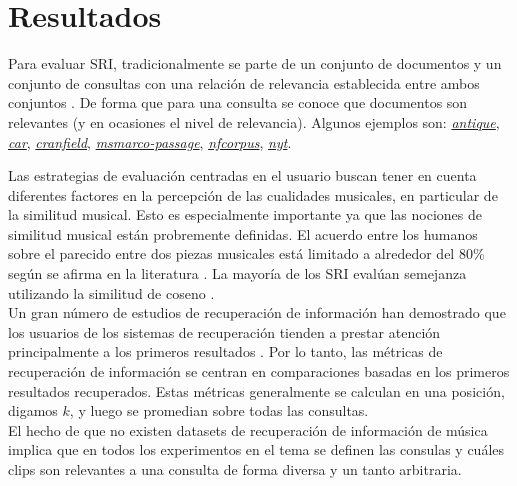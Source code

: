 \section{Resultados}
\label{sec:results}
Para evaluar SRI, tradicionalmente se parte de un conjunto de documentos y un conjunto de consultas con una relación de relevancia establecida entre ambos conjuntos \cite{manning2008introductiontoIR}. De forma que para una consulta se conoce que documentos son relevantes (y en ocasiones el nivel de relevancia). Algunos ejemplos son: \href{https://ir-datasets.com/antique.html}{\textit{antique}}, \href{https://ir-datasets.com/car.html}{\textit{car}}, \href{https://ir-datasets.com/cranfield.html}{\textit{cranfield}}, \href{https://ir-datasets.com/msmarco-passage.html}{\textit{msmarco-passage}}, \href{https://ir-datasets.com/nfcorpus.html}{\textit{nfcorpus}}, \href{https://ir-datasets.com/nyt.html}{\textit{nyt}}.

Las estrategias de evaluación centradas en el usuario buscan tener en cuenta diferentes factores en la percepción de las cualidades musicales, en particular de la similitud musical. Esto es especialmente importante ya que las nociones de similitud musical están probremente definidas. El acuerdo entre los humanos sobre el parecido entre dos piezas musicales está limitado a alrededor del 80\% según se afirma en la literatura \cite{Schedl2014MusicIR}.
La mayoría de los SRI evalúan semejanza utilizando la similitud de coseno \cite{Brundha2022VectorMB}.\\
Un gran número de estudios de recuperación de información han demostrado que los usuarios de los sistemas de recuperación tienden a prestar atención principalmente a los primeros resultados \cite{Mitra2017NeuralMF}. Por lo tanto, las métricas de recuperación de información se centran en comparaciones basadas en los primeros resultados recuperados. Estas métricas generalmente se calculan en una posición, digamos $k$, y luego se promedian sobre todas las consultas.\\

El hecho de que no existen datasets de recuperación de información de música implica que en todos los experimentos en el tema se definen las consulas y cuáles clips son relevantes a una consulta de forma diversa y un tanto arbitraria.

